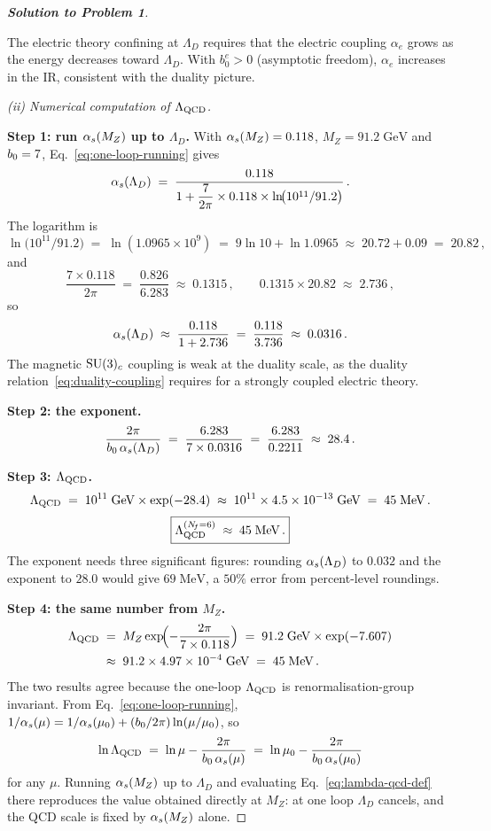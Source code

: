 \documentclass[11pt,a4paper]{article}
\begin{document}
\begin{proof}[\textbf{Solution to Problem 1}]
\begin{remark}
  The electric theory confining at $\Lambda_D$ requires that the
  electric coupling $\alpha_e$ grows as the energy decreases toward
  $\Lambda_D$. With $b_0^e > 0$ (asymptotic freedom), $\alpha_e$
  increases in the IR, consistent with the duality picture.
\end{remark}

\textit{(ii) Numerical computation of $\Lambda_{\mathrm{QCD}}$.}

\textbf{Step 1: run $\alpha_s(M_Z)$ up to $\Lambda_D$.}
With $\alpha_s(M_Z) = 0.118$, $M_Z = 91.2\;\text{GeV}$ and $b_0 = 7$,
Eq.~\eqref{eq:one-loop-running} gives
\[
  \alphas(\Lambda_D)
  \;=\; \frac{0.118}{%
    1 + \dfrac{7}{2\pi} \times 0.118 \times
    \ln\!\bigl(10^{11}/91.2\bigr)}\,.
\]
The logarithm is
\[
  \ln\!\bigl(10^{11}/91.2\bigr)
  \;=\; \ln(1.0965 \times 10^{9})
  \;=\; 9 \ln 10 + \ln 1.0965
  \;\approx\; 20.72 + 0.09
  \;=\; 20.82\,,
\]
and
\[
  \frac{7 \times 0.118}{2\pi}
  \;=\; \frac{0.826}{6.283}
  \;\approx\; 0.1315\,,
  \qquad
  0.1315 \times 20.82 \;\approx\; 2.736\,,
\]
so
\[
  \alpha_s(\Lambda_D)
  \;\approx\; \frac{0.118}{1 + 2.736}
  \;=\; \frac{0.118}{3.736}
  \;\approx\; 0.0316\,.
\]
The magnetic $\mathrm{SU}(3)_c$ coupling is weak at the duality scale, as the
duality relation~\eqref{eq:duality-coupling} requires for a strongly
coupled electric theory.

\textbf{Step 2: the exponent.}
\[
  \frac{2\pi}{b_0\, \alpha_s(\Lambda_D)}
  \;=\; \frac{6.283}{7 \times 0.0316}
  \;=\; \frac{6.283}{0.2211}
  \;\approx\; 28.4\,.
\]

\textbf{Step 3: $\Lambda_{\mathrm{QCD}}$.}
\[
  \Lambda_{\mathrm{QCD}}
  \;=\; 10^{11}\;\text{GeV} \times \exp(-28.4)
  \;\approx\; 10^{11} \times 4.5 \times 10^{-13}\;\text{GeV}
  \;=\; 45\;\text{MeV}\,.
\]
\[
  \boxed{\Lambda_{\mathrm{QCD}}^{(N_{\!f}=6)}
  \;\approx\; 45\;\text{MeV}\,.}
\]
The exponent needs three significant figures: rounding
$\alpha_s(\Lambda_D)$ to $0.032$ and the exponent to $28.0$ would give
$69\;\text{MeV}$, a $50\%$ error from percent-level roundings.

\textbf{Step 4: the same number from $M_Z$.}
\begin{align*}
  \Lambda_{\mathrm{QCD}}
  &\;=\; M_Z \exp\!\Bigl(-\frac{2\pi}{7 \times 0.118}\Bigr)
  \;=\; 91.2\;\text{GeV} \times \exp(-7.607) \\
  &\;\approx\; 91.2 \times 4.97 \times 10^{-4}\;\text{GeV}
  \;=\; 45\;\text{MeV}\,.
\end{align*}
The two results agree because the one-loop $\Lambda_{\mathrm{QCD}}$ is
renormalisation-group invariant.  From Eq.~\eqref{eq:one-loop-running},
$1/\alpha_s(\mu) = 1/\alpha_s(\mu_0) + (b_0/2\pi)\ln(\mu/\mu_0)$, so
\[
  \ln\Lambda_{\mathrm{QCD}}
  \;=\; \ln\mu - \frac{2\pi}{b_0\,\alpha_s(\mu)}
  \;=\; \ln\mu_0 - \frac{2\pi}{b_0\,\alpha_s(\mu_0)}
\]
for any $\mu$.  Running $\alpha_s(M_Z)$ up to $\Lambda_D$ and
evaluating Eq.~\eqref{eq:lambda-qcd-def} there reproduces the value
obtained directly at $M_Z$: at one loop $\Lambda_D$ cancels, and the
QCD scale is fixed by $\alpha_s(M_Z)$ alone.


\end{proof}
\end{document}
